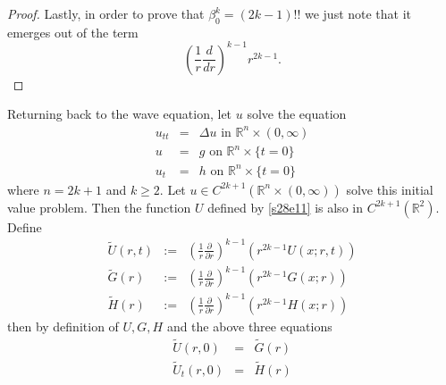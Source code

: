 \documentclass{article}
\theoremstyle{plain}
\numberwithin{thm}{section}
\theoremstyle{plain}
\numberwithin{prop}{section}
\theoremstyle{definition}
\numberwithin{defn}{section}
\theoremstyle{remark}
\numberwithin{equation}{section}
\begin{document}
\begin{proof}
\noindent Lastly, in order to prove that $\beta_0^k = (2k-1)!!$ we just note that it emerges out of the term
\[
\left(\frac{1}{r}\frac{d}{dr}\right)^{k-1} r^{2k-1}.
\]
\end{proof}

Returning back to the wave equation, let $u$ solve the equation
\begin{eqnarray}
u_{tt} &=& \Delta u \text{ in } \mathbb{R}^n \times (0, \infty) \label{s28e53} \\
u &=& g \text{ on } \mathbb{R}^n \times \{t = 0\} \nonumber \\
u_t &=& h \text{ on } \mathbb{R}^n \times \{t = 0\} \nonumber
\end{eqnarray}
where $n = 2k + 1$ and $k \ge 2$. Let $u \in C^{2k+1}(\mathbb{R}^n \times (0,\infty))$ solve this initial value
problem. Then the function $U$ defined by \eqref{s28e11} is also in $C^{2k+1}(\mathbb{R}^2)$. Define
\begin{eqnarray}
\tilde{U}(r, t) &:=& \left(\frac{1}{r}\frac{\partial}{\partial r}\right)^{k-1}(r^{2k-1}U(x; r,t)) \label{s28e54} \\
\tilde{G}(r) &:=& \left(\frac{1}{r}\frac{\partial}{\partial r}\right)^{k-1}(r^{2k-1}G(x;r)) \label{s28e55} \\
\tilde{H}(r) &:=& \left(\frac{1}{r}\frac{\partial}{\partial r}\right)^{k-1}(r^{2k-1}H(x;r)) \label{s28e56}
\end{eqnarray}
then by definition of $U, G, H$ and the above three equations
\begin{eqnarray}
\tilde{U}(r, 0) &=& \tilde{G}(r) \label{s28e57} \\
\tilde{U}_t(r, 0) &=& \tilde{H}(r) \label{s28e58}
\end{eqnarray}
\end{document}
